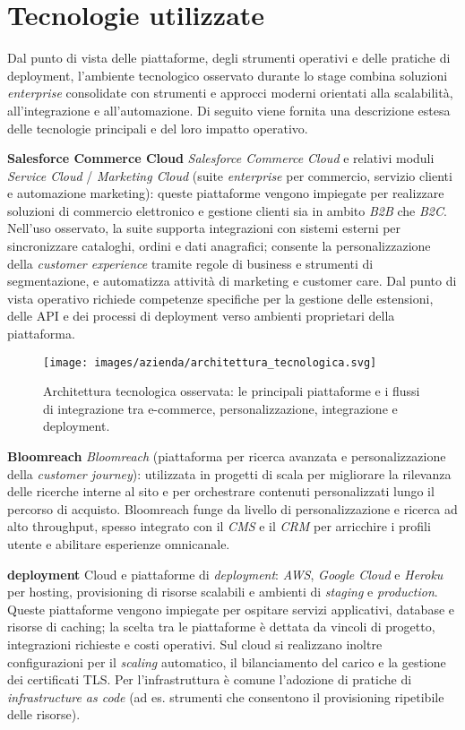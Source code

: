 \section{Tecnologie utilizzate}

Dal punto di vista delle piattaforme, degli strumenti operativi e delle pratiche di deployment, l’ambiente tecnologico osservato durante lo stage combina soluzioni \emph{enterprise} 
consolidate con strumenti e approcci moderni orientati alla scalabilità, all’integrazione e all’automazione. 
Di seguito viene fornita una descrizione estesa delle tecnologie principali e del loro impatto operativo.

\medskip
\noindent\textbf{Salesforce Commerce Cloud}
\emph{Salesforce Commerce Cloud} e relativi moduli \emph{Service Cloud} / \emph{Marketing Cloud} (suite \emph{enterprise} per commercio, servizio clienti e automazione marketing): 
queste piattaforme vengono impiegate per realizzare soluzioni di commercio elettronico e gestione clienti sia in ambito \emph{B2B} che \emph{B2C}. Nell’uso osservato, la suite supporta 
integrazioni con sistemi esterni per sincronizzare cataloghi, ordini e dati anagrafici; consente la personalizzazione della \emph{customer experience} tramite regole di business e strumenti di segmentazione,
e automatizza attività di marketing e customer care. Dal punto di vista operativo richiede competenze specifiche per la gestione delle estensioni, delle API e dei processi di deployment 
verso ambienti proprietari della piattaforma.

\begin{figure}[htbp]
    \centering
    \texttt{[image: images/azienda/architettura\_tecnologica.svg]}
    \caption{Architettura tecnologica osservata: le principali piattaforme e i flussi di integrazione tra e-commerce, personalizzazione, integrazione e deployment.}
    \label{fig:architettura_tecnologica}
\end{figure}


\medskip
\noindent\textbf{Bloomreach}
\emph{Bloomreach} (piattaforma per ricerca avanzata e personalizzazione della \emph{customer journey}): utilizzata in progetti di scala per migliorare la rilevanza delle ricerche 
interne al sito e per orchestrare contenuti personalizzati lungo il percorso di acquisto. Bloomreach funge da livello di personalizzazione e ricerca ad alto throughput, spesso integrato 
con il \emph{CMS} e il \emph{CRM} per arricchire i profili utente e abilitare esperienze omnicanale.

\medskip
\noindent\textbf{deployment}
Cloud e piattaforme di \emph{deployment}: \emph{AWS}, \emph{Google Cloud} e \emph{Heroku} per hosting, provisioning di risorse scalabili e ambienti di \emph{staging} e \emph{production}. 
Queste piattaforme vengono impiegate per ospitare servizi applicativi, database e risorse di caching; la scelta tra le piattaforme è dettata da vincoli di progetto, integrazioni richieste e costi operativi. 
Sul cloud si realizzano inoltre configurazioni per il \emph{scaling} automatico, il bilanciamento del carico e la gestione dei certificati TLS. Per l’infrastruttura 
è comune l’adozione di pratiche di \emph{infrastructure as code} (ad es. strumenti che consentono il provisioning ripetibile delle risorse).

